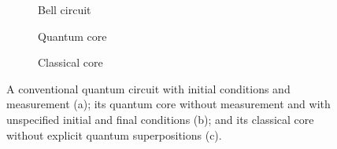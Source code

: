 \documentclass{article}
\begin{document}
\begin{refsection}
\begin{figure}[b]
  \centering
\begin{subfigure}[b]{.25\textwidth}
    \centering
\caption{\label{fig:bell}Bell circuit}
\end{subfigure}
\qquad\qquad
\begin{subfigure}[b]{.25\textwidth}
    \centering
\caption{\label{fig:bellqcore}Quantum core}
\end{subfigure}
\qquad\qquad
\begin{subfigure}[b]{.25\textwidth}
    \centering
\caption{\label{fig:bellccore}Classical core}
\end{subfigure}
\caption{\label{fig:bellall}A conventional quantum circuit with
  initial conditions and measurement (a); its quantum core without
  measurement and with unspecified initial and final conditions (b); and
  its classical core without explicit quantum superpositions (c).}
\end{figure}


\end{refsection}
\end{document}
